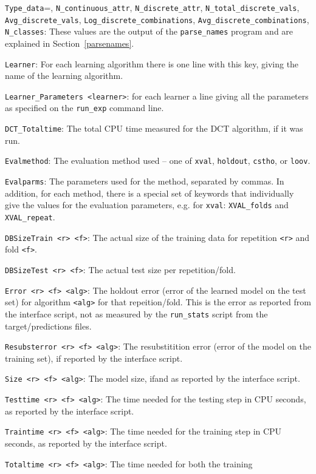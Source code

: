 \documentclass[a4paper,10pt,twoside]{article}
\newenvironment{optionlist}
{\begin{list}{}
    {\setlength{\itemsep}{0em plus0em minus0ex}
      \setlength{\parsep}{0ex}
      \setlength{\topsep}{0em}
      \setlength{\leftmargin}{2em}
      \setlength{\listparindent}{0em}
      \setlength{\itemindent}{-2em}
      \setlength{\partopsep}{0ex}
    }}
  {\end{list}}
\begin{document}
\begin{optionlist}
\item \verb=Type_data==, \verb=N_continuous_attr=, \verb=N_discrete_attr=,
\verb=N_total_discrete_vals=, \verb=Avg_discrete_vals=, \verb=Log_discrete_combinations=, \verb=Avg_discrete_combinations=, \verb=N_classes=: These values 
are the output of the \texttt{parse\_names} program and are explained
in Section~\ref{parsenames}.
\item \verb=Learner=: For each learning algorithm there is one line with
this key, giving the name of the learning algorithm.
\item \verb=Learner_Parameters <learner>=: for each learner a line
giving all the parameters as specified on the \verb=run_exp= command line.
\item \verb=DCT_Totaltime=: The total CPU time measured for the DCT algorithm,
if it was run.
\item \verb=Evalmethod=: The evaluation method used -- one of 
\texttt{xval}, \texttt{holdout}, \texttt{cstho}, or \texttt{loov}.
\item \verb=Evalparms=: The parameters used for the method, separated
by commas. In addition, for each method, there is a special set of 
keywords that individually give the values for the evaluation parameters,
e.g. for \texttt{xval}: \verb=XVAL_folds= and \verb=XVAL_repeat=.
\item \verb=DBSizeTrain <r> <f>=: The actual size of the training data
for repetition \verb=<r>= and fold \verb=<f>=.
\item \verb=DBSizeTest <r> <f>=: The actual test size per repetition/fold.
\item \verb=Error <r> <f> <alg>=: The holdout error (error of the
learned model on the test set) for algorithm \verb=<alg>= 
for that repeition/fold. This is the error as reported from the interface
script, not as measured by the \verb=run_stats= script from the target/predictions files.
\item \verb=Resubsterror <r> <f> <alg>=: The resubstitition error (error
of the model on the training set), if reported by the interface script.
\item \verb=Size <r> <f> <alg>=: The model size, ifand as
 reported by the interface
script. 
\item \verb=Testtime <r> <f> <alg>=: The time needed for the testing step
in CPU seconds, as reported by the interface script.
\item \verb=Traintime <r> <f> <alg>=: The time needed for the training step
in CPU seconds, as reported by the interface script.
\item \verb=Totaltime <r> <f> <alg>=: The time needed for both the training

\end{optionlist}
\end{document}

